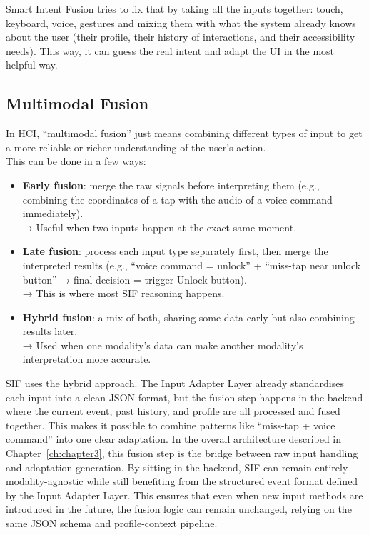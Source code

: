Smart Intent Fusion tries to fix that by taking all the inputs together: touch, keyboard, voice, gestures and mixing them with what the system already knows about the user (their profile, their history of interactions, and their accessibility needs). This way, it can guess the real intent and adapt the UI in the most helpful way.

\subsection{Multimodal Fusion}
In HCI, “multimodal fusion” just means combining different types of input to get a more reliable or richer understanding of the user’s action. 
\\This can be done in a few ways:
\begin{itemize}
    \item \textbf{Early fusion}: merge the raw signals before interpreting them (e.g., combining the coordinates of a tap with the audio of a voice command immediately). \\
    → Useful when two inputs happen at the exact same moment.
    \item \textbf{Late fusion}: process each input type separately first, then merge the interpreted results (e.g., “voice command = unlock” + “miss-tap near unlock button” → final decision = trigger Unlock button).\\
    → This is where most SIF reasoning happens.
    \item \textbf{Hybrid fusion}: a mix of both, sharing some data early but also combining results later. \\
    → Used when one modality’s data can make another modality’s interpretation more accurate.
\end{itemize}
SIF uses the hybrid approach. The Input Adapter Layer already standardises each input into a clean JSON format, but the fusion step happens in the backend where the current event, past history, and profile are all processed and fused together. This makes it possible to combine patterns like “miss-tap + voice command” into one clear adaptation. In the overall architecture described in Chapter~\ref{ch:chapter3}, this fusion step is the bridge between raw input handling and adaptation generation. By sitting in the backend, SIF can remain entirely modality-agnostic while still benefiting from the structured event format defined by the Input Adapter Layer. This ensures that even when new input methods are introduced in the future, the fusion logic can remain unchanged, relying on the same JSON schema and profile-context pipeline.

